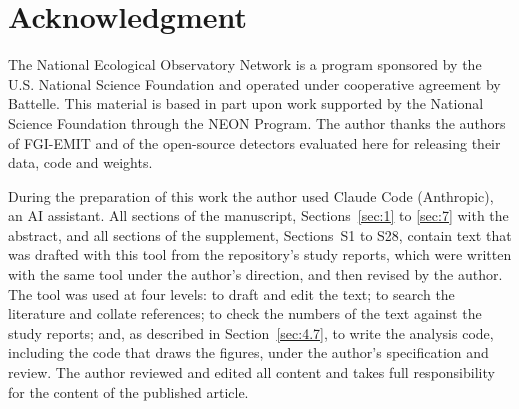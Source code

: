 \documentclass[journal]{IEEEtran}
\begin{document}
\section*{Acknowledgment}

The National Ecological Observatory Network is a program sponsored by the U.S.
National Science Foundation and operated under cooperative agreement by
Battelle. This material is based in part upon work supported by the National
Science Foundation through the NEON Program. The author thanks the authors of
FGI-EMIT and of the open-source detectors evaluated here for releasing their
data, code and weights.

During the preparation of this work the author used Claude Code (Anthropic), an
AI assistant. All sections of the manuscript, Sections~\ref{sec:1} to \ref{sec:7} with the abstract,
and all sections of the supplement, Sections~S1 to S28, contain text that was
drafted with this tool from the repository's study reports, which were written
with the same tool under the author's direction, and then revised by the author.
The tool was used at four levels: to draft and edit the text; to search
the literature and collate references; to check the numbers of the text against
the study reports; and, as described in Section~\ref{sec:4.7}, to write the analysis code,
including the code that draws the figures, under the author's specification and
review. The author reviewed and edited all content and takes full responsibility
for the content of the published article.





\end{document}
